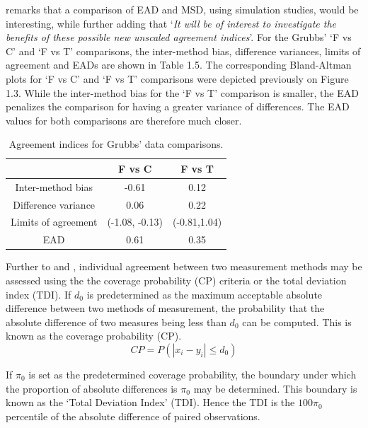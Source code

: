 \documentclass[12pt, a4paper]{report}
\theoremstyle{plain}
\theoremstyle{definition}
\theoremstyle{remark}
\begin{document}
\citet{Barnhart} remarks that a comparison of EAD and MSD, using
simulation studies, would be interesting, while further adding
that `\textit{It will be of interest to investigate the benefits of these
	possible new unscaled agreement indices}'. For the Grubbs' `F vs C' and `F vs T' comparisons, the inter-method bias, difference variances, limits of agreement and EADs are shown
in Table 1.5. The corresponding Bland-Altman plots for `F vs C' and `F vs T' comparisons were depicted previously on Figure 1.3. While the inter-method bias for the `F vs T' comparison is smaller, the EAD penalizes the comparison for having a greater variance of differences. The EAD values for both comparisons are therefore much closer.
\begin{table}[ht]
	\begin{center}
		\begin{tabular}{|c||c|c|}
			\hline
			& F vs C & F vs T  \\\hline
			\hline
			Inter-method bias & -0.61 & 0.12 \\ \hline
			Difference variance & 0.06 & 0.22  \\ \hline 
			Limits of agreement & (-1.08,	-0.13) & (-0.81,1.04) \\ \hline
			EAD & 0.61 & 0.35  \\ \hline 
\end{tabular}
		\caption{Agreement indices for Grubbs' data comparisons.}
	\end{center}
\end{table}

Further to  \citet{lin2000} and \citet{lin2002}, individual agreement between two measurement methods may be
assessed using the the coverage probability (CP) criteria or the total deviation index (TDI). If $d_{0}$ is predetermined as the maximum acceptable absolute difference between two methods of measurement, the probability that the absolute difference of two measures being less than $d_{0}$ can be computed. This is known as the coverage probability (CP).
\begin{equation}
CP = P(|x_{i} - y_{i}| \leq d_{0})
\end{equation}

If $\pi_{0}$ is set as the predetermined coverage probability, the
boundary under which the proportion of absolute differences is
$\pi_{0}$ may be determined. This boundary is known as the `Total Deviation Index' (TDI). Hence the TDI is the $100\pi_{0}$
percentile of the absolute difference of paired observations.
\end{document}
